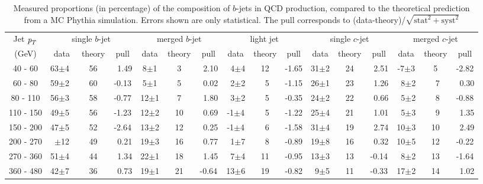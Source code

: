 \begin{table} %
\renewcommand{\arraystretch}{1.2}
\begin{tabular}{ | c || c | c | c || c | c | c || c | c | c || c | c | c || c | c | c ||}
  \hline
  Jet ${\emph{p}_{T}}$ & \multicolumn{3}{c||}{single $b$-jet} & \multicolumn{3}{c||}{merged $b$-jet} 
            & \multicolumn{3}{c||}{~light jet~}    & \multicolumn{3}{c||}{single $c$-jet} 
            & \multicolumn{3}{c||}{merged $c$-jet}
            \\ \cline{2-16}
    (GeV)  &\,data\,&\!\!theory\!\!&\:pull\:&\,data\,&\!\!theory\!\!&\:pull\:&\,data\,&\!\!theory\!\!&\:pull\:&\,data\,&\!\!theory\!\!&\:pull\:&\,data\,&\!\!theory\!\!& pull\\ \hline
   40 - 60 & 63$\pm$4~& 56 & ~1.49 &  8$\pm$1 & 3   & ~2.10 & ~4$\pm$4 &  12 &  -1.65 & 31$\pm$2 & 24 & ~2.51 & -7$\pm$3 &   5 & -2.82\\ 
   60 - 80 & 59$\pm$2~& 60 & -0.13 &  5$\pm$1 & 5   & ~0.02 & ~2$\pm$2 &  ~5 &  -1.15 & 26$\pm$1 & 23 & ~1.26 & ~8$\pm$2 &  ~7 & ~0.30\\ 
   80 - 110& 56$\pm$3~& 58 & -0.77 & 12$\pm$1 & 7   & ~1.80 & ~3$\pm$2 &  ~5 &  -0.35 & 24$\pm$2 & 22 & ~0.66 & ~5$\pm$2 &  ~8 & -0.88\\ 
  110 - 150& 49$\pm$5~& 56 & -1.23 & 12$\pm$2 & 10  & ~0.69 & -1$\pm$4 &  ~5 &  -1.22 & 25$\pm$4 & 21 & ~1.01 & ~5$\pm$3 &  ~9 & ~1.35\\ 
  150 - 200& 47$\pm$5~& 52 & -2.64 & 13$\pm$2 & 12  & ~0.25 & -1$\pm$4 &  ~6 &  -1.58 & 31$\pm$4 & 19 & ~2.74 & 10$\pm$3 &  10 & ~2.49\\ 
  200 - 270&\!\!51$\pm$12\!\!& 49 & ~0.21 & 19$\pm$3 & 16  & ~0.77 & ~1$\pm$7 &  ~8 &  -0.89 & 19$\pm$8 & 16 & ~0.32 & 10$\pm$5 &  12 & -0.22\\ 
  270 - 360& 51$\pm$4~& 44 & ~1.34 & 22$\pm$1 & 18  & ~1.45 & ~7$\pm$4 &  11 &  -0.95 & 13$\pm$3 & 13 & -0.14 & ~8$\pm$2 &  13 & -1.64\\
  360 - 480& 42$\pm$7~& 36 & ~0.73 & 19$\pm$1 & 21  & -0.64 & 13$\pm$6 &  19 &  -0.82 & ~9$\pm$5 & 11 & -0.33 & 17$\pm$2 &  14 & ~1.02\\ \hline
\end{tabular}
\caption{Measured proportions (in percentage) of the composition of $b$-jets in QCD production, compared to the theoretical prediction from a MC {\sc Phythia} simulation. Errors shown are only statistical. The pull corresponds to (data-theory)/$\sqrt{\text{stat}^2+\text{syst}^2}$}
\label{tb:fitfractions}
\end{table}
                   



